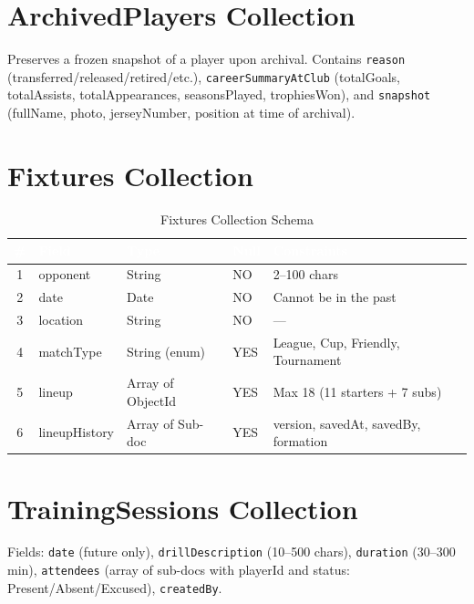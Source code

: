 \documentclass[12pt,a4paper,oneside]{report}
\begin{document}
\section{ArchivedPlayers Collection}

Preserves a frozen snapshot of a player upon archival. Contains \texttt{reason} (transferred/released/retired/etc.), \texttt{careerSummaryAtClub} (totalGoals, totalAssists, totalAppearances, seasonsPlayed, trophiesWon), and \texttt{snapshot} (fullName, photo, jerseyNumber, position at time of archival).

\section{Fixtures Collection}

\begin{table}[H]
\centering
\caption{Fixtures Collection Schema}
\label{tab:fixtures}
\small
\begin{tabularx}{\textwidth}{|c|l|l|l|X|}
\hline
\rowcolor{tableHeader}
\textcolor{white}{\#} & \textcolor{white}{\textbf{Field}} & \textcolor{white}{\textbf{Type}} & \textcolor{white}{\textbf{Null}} & \textcolor{white}{\textbf{Constraints}} \\
\hline
1 & opponent        & String                & NO  & 2--100 chars \\
\hline\rowcolor{tableRow}
2 & date            & Date                  & NO  & Cannot be in the past \\
\hline
3 & location        & String                & NO  & --- \\
\hline\rowcolor{tableRow}
4 & matchType       & String (enum)         & YES & League, Cup, Friendly, Tournament \\
\hline
5 & lineup          & Array of ObjectId     & YES & Max 18 (11 starters + 7 subs) \\
\hline\rowcolor{tableRow}
6 & lineupHistory   & Array of Sub-doc      & YES & version, savedAt, savedBy, formation \\
\hline
\end{tabularx}
\end{table}

\section{TrainingSessions Collection}

Fields: \texttt{date} (future only), \texttt{drillDescription} (10--500 chars), \texttt{duration} (30--300 min), \texttt{attendees} (array of sub-docs with playerId and status: Present/Absent/Excused), \texttt{createdBy}.
\end{document}
